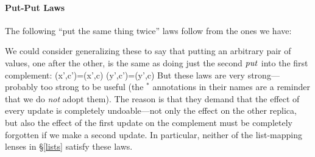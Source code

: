 \iffull
\paragraph*{Put-Put Laws}

\begin{lemma} The following ``put the same thing twice'' laws follow from
the ones we have:
\end{lemma}

We could consider generalizing these to say that putting an arbitrary pair
of values, one after the other, is the same as doing just the second $\mathit{put}$
into the first complement:
{
 {\putr(x',c')=\putr(x',c)}
 {\putl(y',c')=\putl(y',c)}
}
%
But these laws are very strong---probably too strong to be useful (the
$^\ast$ annotations in their names are a reminder that we do {\em not} adopt
them).  The reason is that they demand that the effect of every update is
completely undoable---not only the effect on the other replica, but also the
effect of the first update on the complement must be completely forgotten if
we make a second update.  In particular, neither of the list-mapping lenses
in \S\ref{lists} satisfy these laws.
\fi


